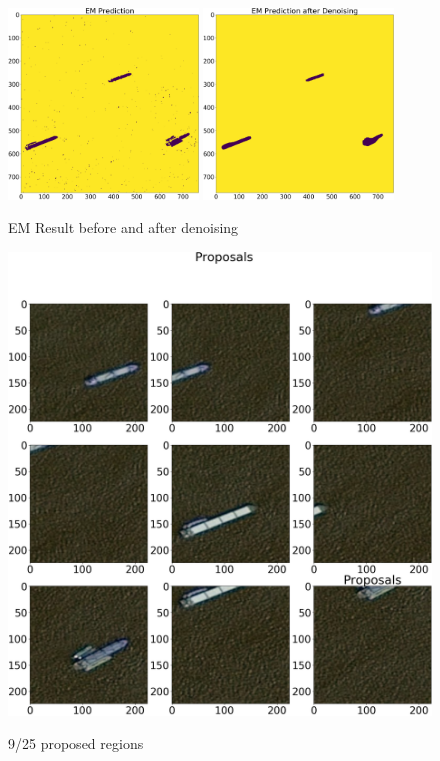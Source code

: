 \begin{figure}[H] 
	\centering
	\includegraphics[width=0.45\textwidth]{Pictures/011EMPred.png}
	\includegraphics[width=0.45\textwidth]{Pictures/011Denoising.png}
	\caption{EM Result before and after denoising}
	\label{em_pic}
\end{figure}
\begin{figure}[H]
	\centering
	\includegraphics[height=0.6\textheight]{Pictures/011Proposals.png}\\
	\caption{9/25 proposed regions}
	\label{propose_pic}
\end{figure}
